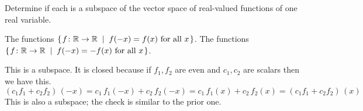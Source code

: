 

\begin{Exercise}[
name={},
title={}, 
difficulty=0,
origin={\cite{JH}}]
Determine if each is a subspace of the vector space of real-valued
functions of one real variable.

\Question The 
         functions
        \( \mbox{$\left\{\hspace{0.1em}\mbox{$f\colon \mathbb{R}\to \mathbb{R}$} \;\;\middle|\;\; f(-x)=f(x) \text{ for all } x\hspace{0.1em}\right\}$} \).
\Question The 
        functions
        \( \mbox{$\left\{\hspace{0.1em}\mbox{$f\colon \mathbb{R}\to \mathbb{R}$} \;\;\middle|\;\; f(-x)=-f(x) \text{ for all } x\hspace{0.1em}\right\}$} \).
\end{Exercise}

\begin{Answer}
\Question This is a subspace.
          It is closed because if \( f_1,f_2 \) are even and
          \( c_1,c_2 \) are scalars then we have this.
          \begin{equation*}
            (c_1f_1+c_2f_2)\,(-x)
            =c_1\,f_1(-x)+c_2\,f_2(-x)
            =c_1\,f_1(x)+c_2\,f_2(x)
            =(c_1f_1+c_2f_2)\,(x)
          \end{equation*}
\Question This is also a subspace; the check is similar to
          the prior one.

\end{Answer}
